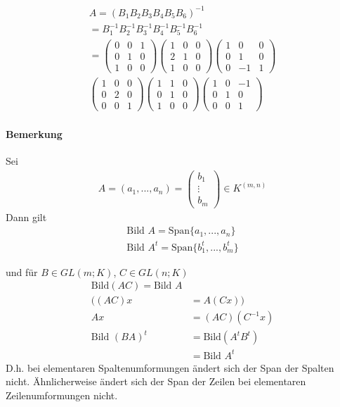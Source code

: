 \documentclass[11pt]{report}
\begin{document}
\begin{align}
A = (B_1 B_2 B_3 B_4 B_5 B_6)^{-1} \\
= B_1^{-1} B_2^{-1} B_3^{-1} B_4^{-1} B_5^{-1} B_6^{-1} \\
= \begin{pmatrix} 0 & 0 & 1 \\ 0 & 1 & 0 \\ 1 & 0 & 0\end{pmatrix} \begin{pmatrix} 1 & 0 & 0 \\ 2 & 1 & 0 \\ 1 & 0 & 0\end{pmatrix} \begin{pmatrix} 1 & 0 & 0 \\ 0 & 1 & 0 \\ 0 & -1 & 1\end{pmatrix} \\ \begin{pmatrix} 1 & 0 & 0 \\ 0 & 2 & 0 \\ 0 & 0 & 1\end{pmatrix} \begin{pmatrix} 1 & 1 & 0 \\ 0 & 1 & 0 \\ 1 & 0 & 0\end{pmatrix} \begin{pmatrix} 1 & 0 & -1 \\ 0 & 1 & 0 \\ 0 & 0 & 1\end{pmatrix}
\end{align}

\paragraph{Bemerkung}
Sei 
\begin{align}
A = (a_1, ..., a_n) =  \begin{pmatrix}b_1 \\ \vdots \\ b_m\end{pmatrix} \in K^{(m,n)}
\end{align}
Dann gilt
\begin{align}
\text{Bild } A = \text{Span}\{a_1, ..., a_n\} \\
\text{Bild } A^t= \text{Span}\{b_1^t, ..., b_m^t\} 
\end{align}

und für $B \in GL(m;K)$, $C \in GL(n;K)$
\begin{align}
\text{Bild} (AC) = \text{Bild }A \\
((AC)x &= A(Cx)) \\
Ax &= (AC)(C^{-1}x)\\
\text{Bild } (BA)^t &= \text{Bild}(A^t B^t) \\
 &= \text{Bild } A^t
\end{align}
D.h. bei elementaren Spaltenumformungen ändert sich der Span der Spalten nicht. Ähnlicherweise ändert sich der Span der Zeilen bei elementaren Zeilenumformungen nicht.
\end{document}
